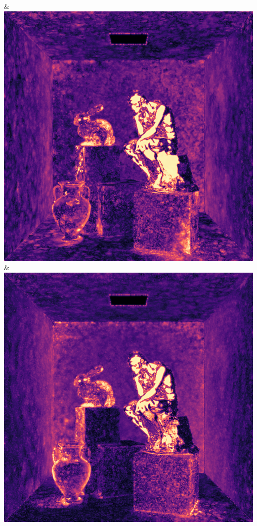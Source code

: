 & \includegraphics[width=\linewidth]{figures/py/tests/quality_comparison/nrc+sppc14@4_1spp_thinker_flip.png}
& \includegraphics[width=\linewidth]{figures/py/tests/quality_comparison/nrc+sppc16@1_1spp_thinker_flip.png}
